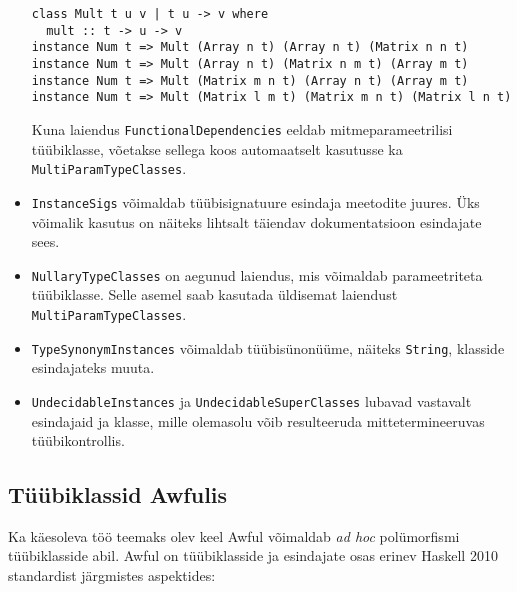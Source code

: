 \documentclass[12pt]{article}
\begin{document}
\begin{itemize}
            \begin{verbatim}class Mult t u v | t u -> v where
  mult :: t -> u -> v
instance Num t => Mult (Array n t) (Array n t) (Matrix n n t)
instance Num t => Mult (Array n t) (Matrix n m t) (Array m t)
instance Num t => Mult (Matrix m n t) (Array n t) (Array m t)
instance Num t => Mult (Matrix l m t) (Matrix m n t) (Matrix l n t)\end{verbatim}

            Kuna laiendus \verb!FunctionalDependencies! eeldab mitmeparameetrilisi tüübiklasse, võetakse sellega koos automaatselt kasutusse ka \verb!MultiParamTypeClasses!.
          \item
            \verb!InstanceSigs! võimaldab tüübisignatuure esindaja meetodite juures. Üks võimalik kasutus on näiteks lihtsalt täiendav dokumentatsioon esindajate sees.
          \item
            \verb!NullaryTypeClasses! on aegunud laiendus, mis võimaldab parameetriteta tüübiklasse. Selle asemel saab kasutada üldisemat laiendust \verb!MultiParamTypeClasses!.
          \item
            \verb!TypeSynonymInstances! võimaldab tüübisünonüüme, näiteks \verb!String!, klasside esindajateks muuta.
          \item
            \verb!UndecidableInstances! ja \verb!UndecidableSuperClasses! lubavad vastavalt esindajaid ja klasse, mille olemasolu võib resulteeruda mittetermineeruvas tüübikontrollis.
        \end{itemize}
    \subsection{Tüübiklassid Awfulis}
      Ka käesoleva töö teemaks olev keel Awful võimaldab \textit{ad hoc} polümorfismi tüübiklasside abil. Awful on tüübiklasside ja esindajate osas erinev Haskell 2010 standardist järgmistes aspektides:
\end{document}
